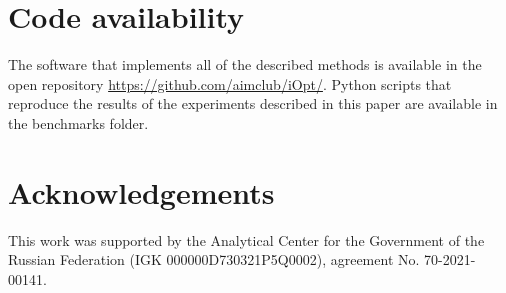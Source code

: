 \documentclass[preprint,12pt]{elsarticle}
\begin{document}
\section*{Code availability}
The software that implements all of the described methods is available in the open repository \url{https://github.com/aimclub/iOpt/}.
Python scripts that reproduce the results of the experiments described in this paper are available in the benchmarks folder.

\section*{Acknowledgements}
This work was supported by the Analytical Center for the Government of the Russian Federation (IGK 000000D730321P5Q0002), agreement No. 70-2021-00141.




 






\end{document}
